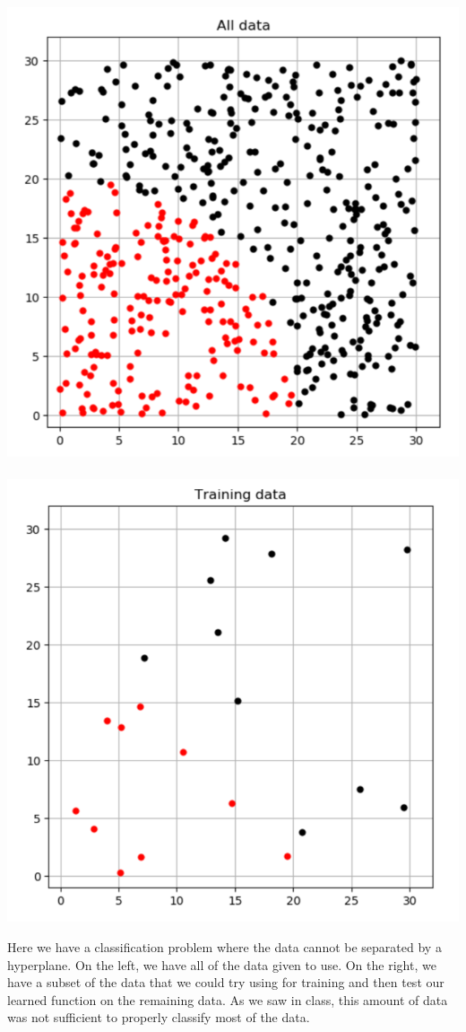 \begin{example}{}{}
\begin{center}
\includegraphics[scale = 0.3]{optimization/figures/figures-static/svm-nonlinear} \ \ \ \ \ \includegraphics[scale = 0.3]{optimization/figures/figures-static/svm-nonlinear-training}
\end{center}
Here we have a classification problem where the data cannot be separated by a hyperplane.  On the left, we have all of the data given to use.  On the right, we have a subset of the data that we could try using for training and then test our learned function on the remaining data.  As we saw in class, this amount of data was not sufficient to properly classify most of the data.
\end{example}

